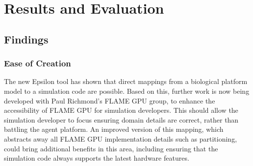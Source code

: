 \documentclass{UoYCSproject}
\begin{document}
\chapter{Results and Evaluation}
\label{results}


\section{Findings}
\subsection{Ease of Creation}
The new Epsilon tool has shown that direct mappings from a biological platform model to a simulation code are possible.
Based on this, further work is now being developed with Paul Richmond's \gls{FLAME GPU} group, to enhance the accessibility of \gls{FLAME GPU} for simulation developers.
This should allow the simulation developer to focus ensuring domain details are correct, rather than battling the agent platform.
An improved version of this mapping, which abstracts away all \gls{FLAME GPU} implementation details such as partitioning, could bring additional benefits in this area, including ensuring that the simulation code always supports the latest hardware features.
\end{document}
